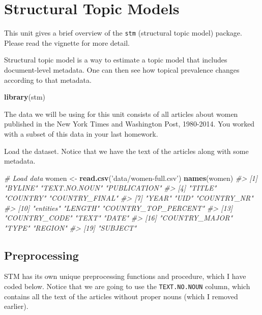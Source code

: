 \documentclass[]{book}
\newenvironment{Shaded}{\begin{snugshade}}{\end{snugshade}}
\newcommand{\KeywordTok}[1]{\textcolor[rgb]{0.13,0.29,0.53}{\textbf{#1}}}
\newcommand{\StringTok}[1]{\textcolor[rgb]{0.31,0.60,0.02}{#1}}
\newcommand{\CommentTok}[1]{\textcolor[rgb]{0.56,0.35,0.01}{\textit{#1}}}
\newcommand{\NormalTok}[1]{#1}
\begin{document}
\section{Structural Topic Models}\label{structural-topic-models}

This unit gives a brief overview of the \texttt{stm} (structural topic
model) package. Please read the vignette for more detail.

Structural topic model is a way to estimate a topic model that includes
document-level metadata. One can then see how topical prevalence changes
according to that metadata.

\begin{Shaded}
\begin{Highlighting}[]
\KeywordTok{library}\NormalTok{(stm)}
\end{Highlighting}
\end{Shaded}

The data we will be using for this unit consists of all articles about
women published in the New York Times and Washington Post, 1980-2014.
You worked with a subset of this data in your last homework.

Load the dataset. Notice that we have the text of the articles along
with some metadata.

\begin{Shaded}
\begin{Highlighting}[]
\CommentTok{# Load data}
\NormalTok{women <-}\StringTok{ }\KeywordTok{read.csv}\NormalTok{(}\StringTok{'data/women-full.csv'}\NormalTok{)}
\KeywordTok{names}\NormalTok{(women)}
\CommentTok{#>  [1] "BYLINE"              "TEXT.NO.NOUN"        "PUBLICATION"        }
\CommentTok{#>  [4] "TITLE"               "COUNTRY"             "COUNTRY_FINAL"      }
\CommentTok{#>  [7] "YEAR"                "UID"                 "COUNTRY_NR"         }
\CommentTok{#> [10] "entities"            "LENGTH"              "COUNTRY_TOP_PERCENT"}
\CommentTok{#> [13] "COUNTRY_CODE"        "TEXT"                "DATE"               }
\CommentTok{#> [16] "COUNTRY_MAJOR"       "TYPE"                "REGION"             }
\CommentTok{#> [19] "SUBJECT"}
\end{Highlighting}
\end{Shaded}

\subsection{Preprocessing}\label{preprocessing-1}

STM has its own unique preprocessing functions and procedure, which I
have coded below. Notice that we are going to use the
\texttt{TEXT.NO.NOUN} column, which contains all the text of the
articles without proper nouns (which I removed earlier).
\end{document}
